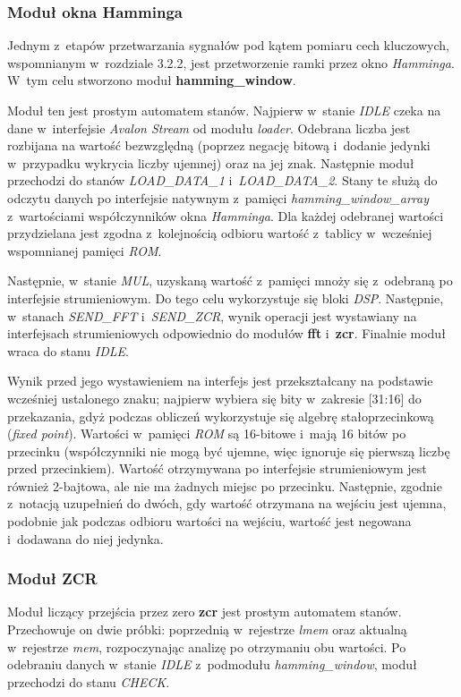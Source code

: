 \subsubsection{Moduł okna Hamminga}
Jednym z~etapów przetwarzania sygnałów pod kątem pomiaru cech kluczowych, wspomnianym w~rozdziale 3.2.2, jest przetworzenie ramki przez okno \textit{Hamminga}. W~tym celu stworzono moduł \textbf{hamming\_window}.

Moduł ten jest prostym automatem stanów. Najpierw w~stanie \textit{IDLE} czeka na dane w~interfejsie \textit{Avalon Stream} od modułu \textit{loader}. Odebrana liczba jest rozbijana na wartość bezwzględną (poprzez negację bitową i~dodanie jedynki w~przypadku wykrycia liczby ujemnej) oraz na jej znak. Następnie moduł przechodzi do stanów \textit{LOAD\_DATA\_1} i~\textit{LOAD\_DATA\_2}. Stany te służą do odczytu danych po interfejsie natywnym z~pamięci \textit{hamming\_window\_array} z~wartościami współczynników okna \textit{Hamminga}. Dla każdej odebranej wartości przydzielana jest zgodna z~kolejnością odbioru wartość z~tablicy w~wcześniej wspomnianej pamięci \textit{ROM}.

Następnie, w~stanie \textit{MUL}, uzyskaną wartość z~pamięci mnoży się z~odebraną po interfejsie strumieniowym. Do tego celu wykorzystuje się bloki \textit{DSP}. Następnie, w~stanach \textit{SEND\_FFT} i~\textit{SEND\_ZCR}, wynik operacji jest wystawiany na interfejsach strumieniowych odpowiednio do modułów \textbf{fft} i~\textbf{zcr}. Finalnie moduł wraca do stanu \textit{IDLE}.

Wynik przed jego wystawieniem na interfejs jest przekształcany na podstawie wcześniej ustalonego znaku; najpierw wybiera się bity w~zakresie [31:16] do przekazania, gdyż podczas obliczeń wykorzystuje się algebrę stałoprzecinkową (\textit{fixed point}). Wartości w~pamięci \textit{ROM} są 16-bitowe i~mają 16 bitów po przecinku (współczynniki nie mogą być ujemne, więc ignoruje się pierwszą liczbę przed przecinkiem). Wartość otrzymywana po interfejsie strumieniowym jest również 2-bajtowa, ale nie ma żadnych miejsc po przecinku. Następnie, zgodnie z~notacją uzupełnień do dwóch, gdy wartość otrzymana na wejściu jest ujemna, podobnie jak podczas odbioru wartości na wejściu, wartość jest negowana i~dodawana do niej jedynka.

\subsubsection{Moduł ZCR}

Moduł liczący przejścia przez zero \textbf{zcr} jest prostym automatem stanów. Przechowuje on dwie próbki: poprzednią w~rejestrze \textit{lmem} oraz aktualną w~rejestrze \textit{mem}, rozpoczynając analizę po otrzymaniu obu wartości. Po odebraniu danych w~stanie \textit{IDLE} z~podmodułu \textit{hamming\_window}, moduł przechodzi do stanu \textit{CHECK}.

